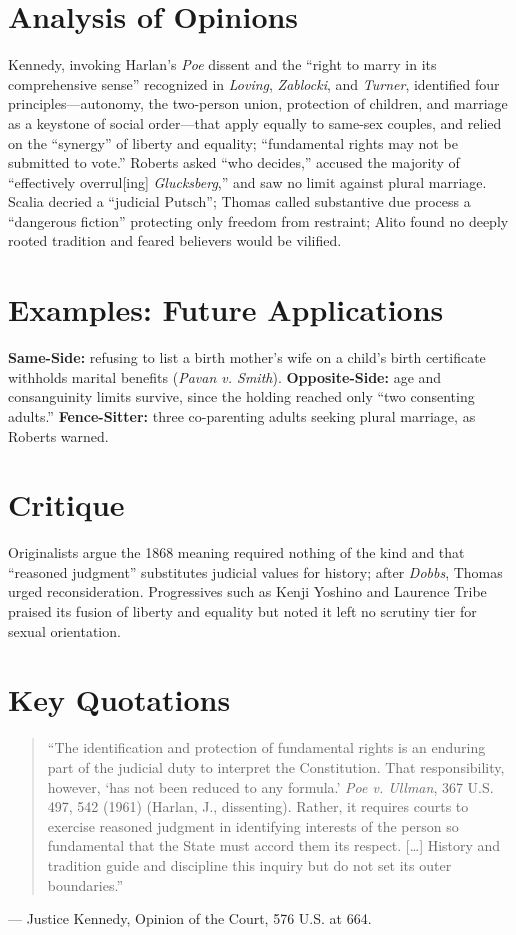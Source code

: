 \documentclass[12pt]{article}
\begin{document}
\section{Analysis of Opinions}
Kennedy, invoking Harlan's \textit{Poe} dissent and the ``right to marry in its comprehensive sense'' recognized in \textit{Loving}, \textit{Zablocki}, and \textit{Turner}, identified four principles---autonomy, the two-person union, protection of children, and marriage as a keystone of social order---that apply equally to same-sex couples, and relied on the ``synergy'' of liberty and equality; ``fundamental rights may not be submitted to vote.'' Roberts asked ``who decides,'' accused the majority of ``effectively overrul[ing] \textit{Glucksberg},'' and saw no limit against plural marriage. Scalia decried a ``judicial Putsch''; Thomas called substantive due process a ``dangerous fiction'' protecting only freedom from restraint; Alito found no deeply rooted tradition and feared believers would be vilified.

\section{Examples: Future Applications}
\textbf{Same-Side:} refusing to list a birth mother's wife on a child's birth certificate withholds marital benefits (\textit{Pavan v. Smith}). \textbf{Opposite-Side:} age and consanguinity limits survive, since the holding reached only ``two consenting adults.'' \textbf{Fence-Sitter:} three co-parenting adults seeking plural marriage, as Roberts warned.

\section{Critique}
Originalists argue the 1868 meaning required nothing of the kind and that ``reasoned judgment'' substitutes judicial values for history; after \textit{Dobbs}, Thomas urged reconsideration. Progressives such as Kenji Yoshino and Laurence Tribe praised its fusion of liberty and equality but noted it left no scrutiny tier for sexual orientation.

\section{Key Quotations}
\begin{quote}
``The identification and protection of fundamental rights is an enduring part of the judicial duty to interpret the Constitution. That responsibility, however, `has not been reduced to any formula.' \textit{Poe v. Ullman}, 367 U.S. 497, 542 (1961) (Harlan, J., dissenting). Rather, it requires courts to exercise reasoned judgment in identifying interests of the person so fundamental that the State must accord them its respect. [\dots] History and tradition guide and discipline this inquiry but do not set its outer boundaries.''
\end{quote}
\noindent --- Justice Kennedy, Opinion of the Court, 576 U.S. at 664.
\end{document}

